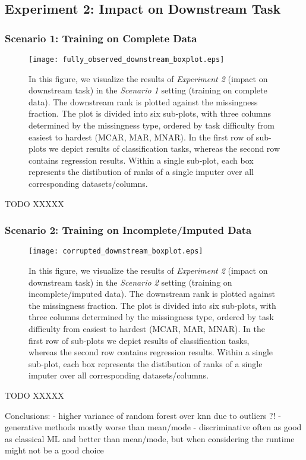 \subsection{Experiment 2: Impact on Downstream Task}


\subsubsection{Scenario 1: Training on Complete Data}


\begin{figure}\centering
	\texttt{[image: fully\_observed\_downstream\_boxplot.eps]}

	\caption[Downstream Ranks - Fully Observed]{In this figure, we visualize the results of \textit{Experiment 2} (impact on downstream task) in the \textit{Scenario 1} setting (training on complete data). The downstream rank is plotted against the missingness fraction. The plot is divided into six sub-plots, with three columns determined by the missingness type, ordered by task difficulty from easiest to hardest (MCAR, MAR, MNAR). In the first row of sub-plots we depict results of classification tasks, whereas the second row contains regression results. Within a single sub-plot, each box represents the distibution of ranks of a single imputer over all corresponding datasets/columns.
    }
	\label{fig:fully_observed_downstream_boxplot}
\end{figure}

TODO XXXXX


\subsubsection{Scenario 2: Training on Incomplete/Imputed Data}


\begin{figure}\centering
	\texttt{[image: corrupted\_downstream\_boxplot.eps]}

	\caption[Downstream Ranks - Corrupted]{In this figure, we visualize the results of \textit{Experiment 2} (impact on downstream task) in the \textit{Scenario 2} setting (training on incomplete/imputed data). The downstream rank is plotted against the missingness fraction. The plot is divided into six sub-plots, with three columns determined by the missingness type, ordered by task difficulty from easiest to hardest (MCAR, MAR, MNAR). In the first row of sub-plots we depict results of classification tasks, whereas the second row contains regression results. Within a single sub-plot, each box represents the distibution of ranks of a single imputer over all corresponding datasets/columns.
    }
	\label{fig:corrupted_downstream_boxplot}
\end{figure}

TODO XXXXX



Conclusions:
- higher variance of random forest over knn due to outliers ?!
- generative methods mostly worse than mean/mode
- discriminative often as good as classical ML and better than mean/mode, but when considering
the runtime might not be a good choice
